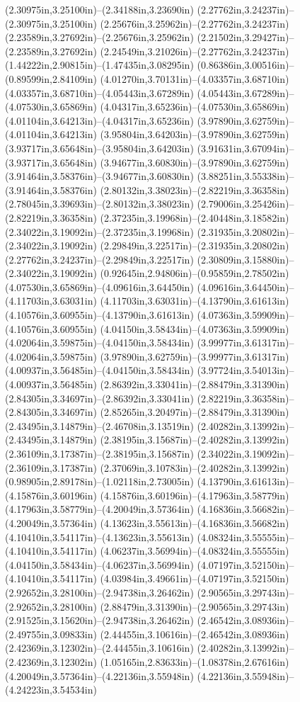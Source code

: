 (2.30975in,3.25100in)--(2.34188in,3.23690in) (2.27762in,3.24237in)--(2.30975in,3.25100in) (2.25676in,3.25962in)--(2.27762in,3.24237in) (2.23589in,3.27692in)--(2.25676in,3.25962in) (2.21502in,3.29427in)--(2.23589in,3.27692in) (2.24549in,3.21026in)--(2.27762in,3.24237in) (1.44222in,2.90815in)--(1.47435in,3.08295in) (0.86386in,3.00516in)--(0.89599in,2.84109in) (4.01270in,3.70131in)--(4.03357in,3.68710in) (4.03357in,3.68710in)--(4.05443in,3.67289in) (4.05443in,3.67289in)--(4.07530in,3.65869in) (4.04317in,3.65236in)--(4.07530in,3.65869in) (4.01104in,3.64213in)--(4.04317in,3.65236in) (3.97890in,3.62759in)--(4.01104in,3.64213in) (3.95804in,3.64203in)--(3.97890in,3.62759in) (3.93717in,3.65648in)--(3.95804in,3.64203in) (3.91631in,3.67094in)--(3.93717in,3.65648in) (3.94677in,3.60830in)--(3.97890in,3.62759in) (3.91464in,3.58376in)--(3.94677in,3.60830in) (3.88251in,3.55338in)--(3.91464in,3.58376in) (2.80132in,3.38023in)--(2.82219in,3.36358in) (2.78045in,3.39693in)--(2.80132in,3.38023in) (2.79006in,3.25426in)--(2.82219in,3.36358in) (2.37235in,3.19968in)--(2.40448in,3.18582in) (2.34022in,3.19092in)--(2.37235in,3.19968in) (2.31935in,3.20802in)--(2.34022in,3.19092in) (2.29849in,3.22517in)--(2.31935in,3.20802in) (2.27762in,3.24237in)--(2.29849in,3.22517in) (2.30809in,3.15880in)--(2.34022in,3.19092in) (0.92645in,2.94806in)--(0.95859in,2.78502in) (4.07530in,3.65869in)--(4.09616in,3.64450in) (4.09616in,3.64450in)--(4.11703in,3.63031in) (4.11703in,3.63031in)--(4.13790in,3.61613in) (4.10576in,3.60955in)--(4.13790in,3.61613in) (4.07363in,3.59909in)--(4.10576in,3.60955in) (4.04150in,3.58434in)--(4.07363in,3.59909in) (4.02064in,3.59875in)--(4.04150in,3.58434in) (3.99977in,3.61317in)--(4.02064in,3.59875in) (3.97890in,3.62759in)--(3.99977in,3.61317in) (4.00937in,3.56485in)--(4.04150in,3.58434in) (3.97724in,3.54013in)--(4.00937in,3.56485in) (2.86392in,3.33041in)--(2.88479in,3.31390in) (2.84305in,3.34697in)--(2.86392in,3.33041in) (2.82219in,3.36358in)--(2.84305in,3.34697in) (2.85265in,3.20497in)--(2.88479in,3.31390in) (2.43495in,3.14879in)--(2.46708in,3.13519in) (2.40282in,3.13992in)--(2.43495in,3.14879in) (2.38195in,3.15687in)--(2.40282in,3.13992in) (2.36109in,3.17387in)--(2.38195in,3.15687in) (2.34022in,3.19092in)--(2.36109in,3.17387in) (2.37069in,3.10783in)--(2.40282in,3.13992in) (0.98905in,2.89178in)--(1.02118in,2.73005in) (4.13790in,3.61613in)--(4.15876in,3.60196in) (4.15876in,3.60196in)--(4.17963in,3.58779in) (4.17963in,3.58779in)--(4.20049in,3.57364in) (4.16836in,3.56682in)--(4.20049in,3.57364in) (4.13623in,3.55613in)--(4.16836in,3.56682in) (4.10410in,3.54117in)--(4.13623in,3.55613in) (4.08324in,3.55555in)--(4.10410in,3.54117in) (4.06237in,3.56994in)--(4.08324in,3.55555in) (4.04150in,3.58434in)--(4.06237in,3.56994in) (4.07197in,3.52150in)--(4.10410in,3.54117in) (4.03984in,3.49661in)--(4.07197in,3.52150in) (2.92652in,3.28100in)--(2.94738in,3.26462in) (2.90565in,3.29743in)--(2.92652in,3.28100in) (2.88479in,3.31390in)--(2.90565in,3.29743in) (2.91525in,3.15620in)--(2.94738in,3.26462in) (2.46542in,3.08936in)--(2.49755in,3.09833in) (2.44455in,3.10616in)--(2.46542in,3.08936in) (2.42369in,3.12302in)--(2.44455in,3.10616in) (2.40282in,3.13992in)--(2.42369in,3.12302in) (1.05165in,2.83633in)--(1.08378in,2.67616in) (4.20049in,3.57364in)--(4.22136in,3.55948in) (4.22136in,3.55948in)--(4.24223in,3.54534in) 